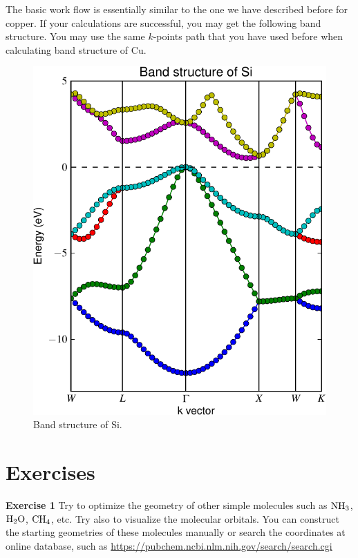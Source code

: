 \documentclass[12pt,english]{paper}
\begin{document}
The basic work flow is essentially similar to the one we have described
before for copper. If your calculations are successful, you may get
the following band structure. You may use the same $k$-points path
that you have used before when calculating band structure of Cu.

\begin{figure}[H]
\noindent \begin{centering}
\includegraphics[scale=0.8]{images/Si_bands_v1}
\par\end{centering}

\caption{Band structure of Si.}
\end{figure}



\section{Exercises}

\textbf{Exercise 1 }Try to optimize the geometry of other simple molecules
such as $\ce{NH3}$, $\ce{H2O}$, $\ce{CH4}$, etc. Try also to visualize
the molecular orbitals. You can construct the starting geometries
of these molecules manually or search the coordinates at online database,
such as \url{https://pubchem.ncbi.nlm.nih.gov/search/search.cgi}
\end{document}

